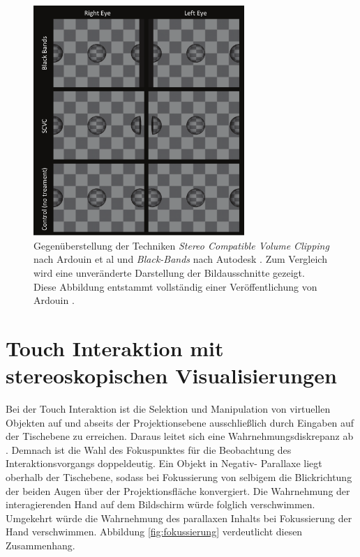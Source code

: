 \begin{figure}
	\begin{center}
		\includegraphics[width=8cm]{img/black_bands_and_SCVC.pdf}
	\end{center}
	\caption{Gegenüberstellung der Techniken \emph{Stereo Compatible Volume Clipping} nach Ardouin et al \cite{ardouin:2011} und \emph{Black-Bands} nach Autodesk \cite{autodesk:2008}. Zum Vergleich wird eine unveränderte Darstellung der Bildausschnitte gezeigt. Diese Abbildung entstammt vollständig einer Veröffentlichung von Ardouin \cite{ardouin:2011}.}
	\label{fig:scvc}
\end{figure}


\section{Touch Interaktion mit stereoskopischen Visualisierungen}
\label{sec:related_touch_interaktion_stereo}

Bei der Touch Interaktion ist die Selektion und Manipulation von virtuellen Objekten auf und abseits der Projektionsebene ausschließlich durch Eingaben auf der Tischebene zu erreichen. Daraus leitet sich eine Wahrnehmungsdiskrepanz ab \cite{valkov:2011,bruder:2013}. Demnach ist die Wahl des Fokuspunktes für die Beobachtung des Interaktionsvorgangs doppeldeutig. Ein Objekt in Negativ- Parallaxe liegt oberhalb der Tischebene, sodass bei Fokussierung von selbigem die Blickrichtung der beiden Augen über der Projektionsfläche konvergiert. Die Wahrnehmung der interagierenden Hand auf dem Bildschirm würde folglich verschwimmen. Umgekehrt würde die Wahrnehmung des parallaxen Inhalts bei Fokussierung der Hand verschwimmen. Abbildung \ref{fig:fokussierung} verdeutlicht diesen Zusammenhang.

